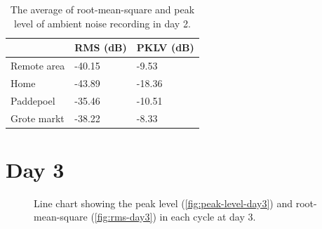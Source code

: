 \begin{table}[H]
\centering
\caption{The average of root-mean-square and peak level of ambient noise recording in day 2.}
\label{tab:ambient-noise-average-day2}
\begin{tabular}{lll} \toprule
            & \ac{RMS} (dB) & \ac{PKLV} (dB) \\ \midrule
Remote area & -40.15                & -9.53          \\
Home        & -43.89                & -18.36           \\
Paddepoel   & -35.46                & -10.51          \\
Grote markt & -38.22              & -8.33        \\ \bottomrule
\end{tabular}
\end{table}





\section{Day 3} %
\label{sec:ambient-noise-day_3}
\begin{figure}[H]
	\begin{adjustwidth}{-1cm}{}
	\centering
	\end{adjustwidth}
	\caption{Line chart showing the peak level (\ref{fig:peak-level-day3}) and root-mean-square (\ref{fig:rms-day3}) in each cycle at day 3.}
	\label{fig:audio-result-day3}
\end{figure}

